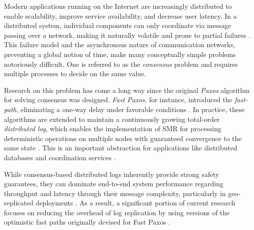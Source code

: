 Modern applications running on the Internet are increasingly distributed to enable scalability, improve service availability, and decrease user latency. In a distributed system, individual components can only coordinate via message passing over a network, making it naturally volatile and prone to partial failures \cite{Coulouris-DistributedSystems-2005}. This failure model and the asynchronous nature of communication networks, preventing a global notion of time, make many conceptually simple problems notoriously difficult. One is referred to as the \textit{consensus} problem \cite{Coulouris-DistributedSystems-2005, Fischer-DistributedConsensus-1985, Dwork-ConsensusPartialSynchrony-1988} and requires multiple processes to decide on the same value.

Research on this problem has come a long way since the original \textit{Paxos} algorithm for solving consensus \cite{Lamport-Paxos-2001} was designed. \textit{Fast Paxos}, for instance, introduced the \textit{fast-path}, eliminating a one-way delay under favorable conditions \cite{Lamport-FastPaxos-2006, Zhao-FastPaxos-2015}. In practice, these algorithms are extended to maintain a continuously growing total-order \textit{distributed log}, which enables the implementation of \gls{SMR} for processing deterministic operations on multiple nodes with guaranteed convergence to the same state \cite{Schneider-ReplicatedStateMachines-1990}. This is an important abstraction for applications like distributed databases \cite{Corbett-GoogleSpanner-2013, Taft-CockroachDB-2020, etcd-Docs} and coordination services \cite{Burrows-Chubby-2006, Hunt-Zookeeper-2010}.

While consensus-based distributed logs inherently provide strong safety guarantees, they can dominate end-to-end system performance regarding throughput and latency through their message complexity, particularly in geo-replicated deployments \cite{Stathakopoulou-RSMScalability-2022, Ryabinin-SwiftPaxos-2024}. As a result, a significant portion of current research focuses on reducing the overhead of log replication by using versions of the optimistic fast paths originally devised for Fast Paxos \cite{Moraru-Epaxos-2013, Park-Curp-2019, Geng-NezhaConsensus-2022}.

